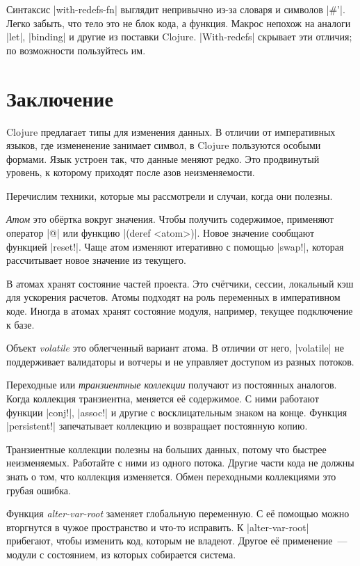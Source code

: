 Синтаксис \spverb|with-redefs-fn| выглядит непривычно из-за словаря и символов
\spverb|#'|. Легко забыть, что тело это не блок кода, а функция. Макрос непохож
на аналоги \spverb|let|, \spverb|binding| и другие из поставки Clojure.
\spverb|With-redefs| скрывает эти отличия; по возможности пользуйтесь им.

\section{Заключение}

Clojure предлагает типы для изменения данных. В отличии от императивных языков,
где измененение занимает символ, в Clojure пользуются особыми формами. Язык
устроен так, что данные меняют редко. Это продвинутый уровень, к которому
приходят после азов неизменяемости.

Перечислим техники, которые мы рассмотрели и случаи, когда они полезны.

\emph{Атом} это об\"{е}ртка вокруг значения. Чтобы получить содержимое, применяют
оператор \spverb|@| или функцию \spverb|(deref <atom>)|. Новое значение сообщают
функцией \spverb|reset!|. Чаще атом изменяют итеративно с помощью
\spverb|swap!|, которая рассчитывает новое значение из текущего.

В атомах хранят состояние частей проекта. Это сч\"{е}тчики, сессии, локальный кэш
для ускорения расчетов. Атомы подходят на роль переменных в императивном
коде. Иногда в атомах хранят состояние модуля, например, текущее подключение к
базе.

Объект \emph{volatile} это облегченный вариант атома. В отличии от него,
\spverb|volatile| не поддерживает валидаторы и вотчеры и не управляет доступом
из разных потоков.

Переходные или \emph{транзиентные коллекции} получают из постоянных
аналогов. Когда коллекция транзиентна, меняется е\"{е} содержимое. С ними работают
функции \spverb|conj!|, \spverb|assoc!| и другие с восклицательным знаком на
конце. Функция \spverb|persistent!| запечатывает коллекцию и возвращает
постоянную копию.

Транзиентные коллекции полезны на больших данных, потому что быстрее
неизменяемых. Работайте с ними из одного потока. Другие части кода не должны
знать о том, что коллекция изменяется. Обмен переходными коллекциями это грубая
ошибка.

Функция \emph{alter-var-root} заменяет глобальную переменную. С е\"{е} помощью можно
вторгнутся в чужое пространство и что-то исправить. К \spverb|alter-var-root|
прибегают, чтобы изменить код, которым не владеют. Другое е\"{е} применение~---
модули с состоянием, из которых собирается система.

